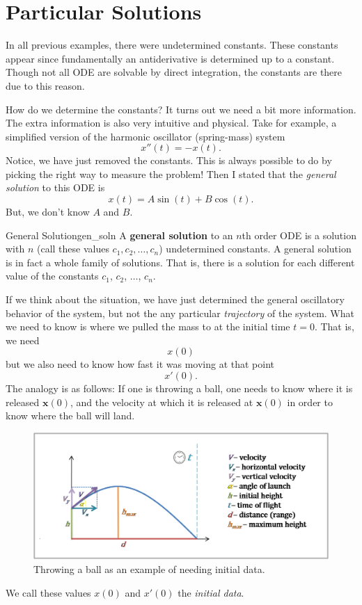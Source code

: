         \section{Particular Solutions}
        In all previous examples, there were undetermined constants.  These constants appear since fundamentally an antiderivative is determined up to a constant.  Though not all ODE are solvable by direct integration, the constants are there due to this reason.
        
        How do we determine the constants?  It turns out we need a bit more information.  The extra information is also very intuitive and physical.  Take for example, a simplified version of the harmonic oscillator (spring-mass) system
        \[
        x''(t) = -x(t).
        \]
        Notice, we have just removed the constants.  This is always possible to do by picking the right way to measure the problem! Then I stated that the \emph{general solution} to this ODE is
        \[
        x(t)=A\sin(t) + B \cos (t).
        \]
        But, we don't know $A$ and $B$.  
        
        \begin{df}{General Solution}{gen_soln}
            A \textbf{general solution} to an $n$th order ODE is a solution with $n$  (call these values $c_1,c_2,\dots,c_n$) undetermined constants. A general solution is in fact a whole family of solutions. That is, there is a solution for each different value of the constants $c_1$, $c_2$, $\dots$, $c_n$.
        \end{df}
        
        If we think about the situation, we have just determined the general oscillatory behavior of the system, but not the any particular \emph{trajectory} of the system. What we need to know is where we pulled the mass to at the initial time $t=0$. That is, we need
        \[
        x(0)
        \]
        but we also need to know how fast it was moving at that point 
        \[
        x'(0).
        \]
        The analogy is as follows: If one is throwing a ball, one needs to know where it is released $\mathbf{x}(0)$, and the velocity at which it is released at $\mathbf{x}(0)$ in order to know where the ball will land.
        \begin{figure}[H]
            \centering
            \includegraphics[width=.7\textwidth]{Figures/projectile-motion.png}
            \caption{Throwing a ball as an example of needing initial data.}
            \label{fig:my_label}
        \end{figure}
        We call these values $x(0)$ and $x'(0)$ the \emph{initial data}. 
        
